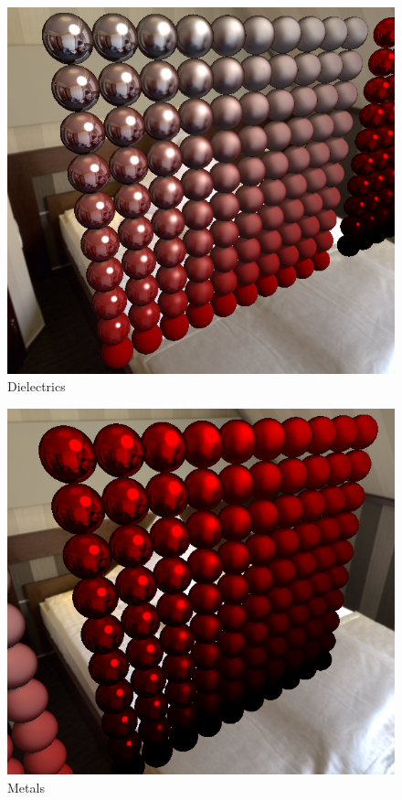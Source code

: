 \begin{figure}[h]
    \centering
    \includegraphics[scale=0.4,clip=true]{./image/pbr_dielectrics.png}
    \caption{Dielectrics}
\label{fig:pbrdielectrics}
\end{figure}

\begin{figure}[h]
    \centering
    \includegraphics[scale=0.4,clip=true]{./image/pbr_metals.png}
    \caption{Metals}
\label{fig:pbrmetals}
\end{figure}

